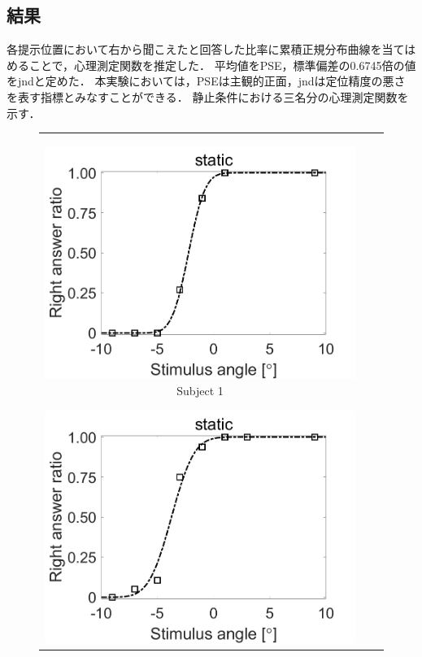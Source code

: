\documentclass[12pt,a4j]{jsarticle}
\renewcommand{\ }{\hspace{1zw}}
\begin{document}
\subsection{結果}
\ 各提示位置において右から聞こえたと回答した比率に累積正規分布曲線を当てはめることで，心理測定関数を推定した．
平均値をPSE，標準偏差の0.6745倍の値をjndと定めた．
本実験においては，PSEは主観的正面，jndは定位精度の悪さを表す指標とみなすことができる．
静止条件における三名分の心理測定関数を示す．
\begin{figure}[htbp]
    \centering
    \begin{tabular}{ccc}
        \begin{minipage}{0.33\columnwidth}
            \centering
            \includegraphics[width=\columnwidth]{./figure/NoMove_maeda.png}
            Subject 1
        \end{minipage}
        \begin{minipage}{0.33\columnwidth}
            \centering
            \includegraphics[width=\columnwidth]{./figure/NoMove_niitsuma.png}

\end{minipage}
\end{tabular}
\end{figure}
\end{document}

